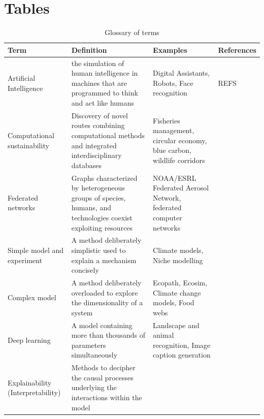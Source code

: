\documentclass[12pt,a4paper]{article}
\begin{document}
\section{Tables}

\begin{table}[]
\begin{center}
\hspace{-0.8 in}\begin{tabular}{ |  p{2.6cm} | p{5cm} | p{4cm} | p{3cm} | }
\hline 
{\bf Term} & {\bf Definition} & {\bf Examples} & {\bf References} \tabularnewline
\hline 
Artificial Intelligence & the simulation of human intelligence in machines that are programmed to think and act like humans  & Digital Assistants, Robots, Face recognition & REFS \tabularnewline
\hline 
 Computational sustainability & Discovery of novel routes combining computational methods and integrated interdisciplinary databases & Fisheries management, circular economy, blue carbon, wildlife corridors &  \tabularnewline
\hline 
Federated networks & Graphs characterized by heterogeneous groups of species,
humans, and technologies coexist exploiting resources & NOAA/ESRL Federated Aerosol Network, federated computer networks &  \tabularnewline
\hline 
Simple model and experiment & A method deliberately simplistic used to explain a mechanism concisely & Climate models, Niche modelling & \tabularnewline
\hline 
 Complex model & A method deliberately overloaded to explore the dimensionality of a system & Ecopath, Ecosim, Climate change models, Food webs & \tabularnewline
\hline 
Deep learning & A model containing more than thousands of parameters simultaneously & Landscape and animal recognition, Image caption generation & \tabularnewline
\hline 
Explainability (Interpretability) & Methods to decipher the causal processes underlying the interactions within the model &  & \tabularnewline

\hline
\end{tabular}
\caption{Glossary of terms}
\end{center}
 \end{table}
\end{document}
